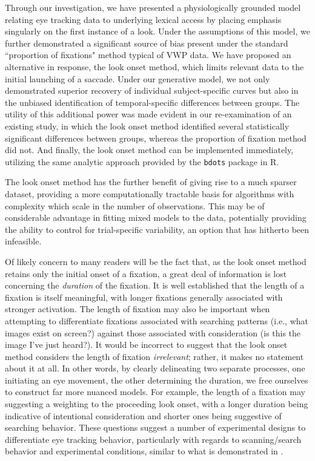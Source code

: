 \documentclass{article}
\newcommand{\xt}{\texttt}
\begin{document}
Through our investigation, we have presented a physiologically grounded model relating eye tracking data to underlying lexical access by placing emphasis singularly on the first instance of a look. Under the assumptions of this model, we further demonstrated a significant source of bias present under the standard ``proportion of fixations" method typical of VWP data. We have proposed an alternative in response, the look onset method, which limits relevant data to the initial launching of a saccade. Under our generative model, we not only demonstrated superior recovery of individual subject-specific curves but also in the unbiased identification of temporal-specific differences between groups. The utility of this additional power was made evident in our re-examination of an existing study, in which the look onset method identified several statistically significant differences between groups, whereas the proportion of fixation method did not. And finally, the look onset method can be implemented immediately, utilizing the same analytic approach provided by the \xt{bdots} package in R.

The look onset method has the further benefit of giving rise to a much sparser dataset, providing a more computationally tractable basis for algorithms with complexity which scale in the number of observations. This may be of considerable advantage in fitting mixed models to the data, potentially providing the ability to control for trial-specific variability, an option that has hitherto been infeasible. 

Of likely concern to many readers will be the fact that, as the look onset method retains only the initial onset of a fixation, a great deal of information is lost concerning the \textit{duration} of the fixation. It is well established \citep{Salthouse1980} that the length of a fixation is itself meaningful, with longer fixations generally associated with stronger activation. The length of fixation may also be important when attempting to differentiate fixations associated with searching patterns (i.e., what images exist on screen?) against those associated with consideration (is this the image I've just heard?). It would be incorrect to suggest that the look onset method considers the length of fixation \textit{irrelevant}; rather, it makes no statement about it at all. In other words, by clearly delineating two separate processes, one initiating an eye movement, the other determining the duration, we free ourselves to construct far more nuanced models. For example, the length of a fixation may suggesting a weighting to the proceeding look onset, with a longer duration being indicative of intentional consideration and shorter ones being suggestive of searching behavior. These questions suggest a number of experimental designs to differentiate eye tracking behavior, particularly with regards to scanning/search behavior and experimental conditions, similar to what is demonstrated in \citet{Apfelbaum2021}.
\end{document}
